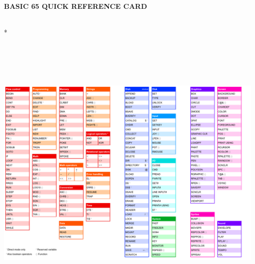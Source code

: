 %

\def\printmanual{true}
\def\printmanualbleed{true}

\hypersetup{colorlinks=false,linkcolor=black,urlcolor=black}
\newpage






\cleardoublepage
{}








\appendix
\begin{appendices}
  
  
  
  
  
  
  
\end{appendices}

\printindex

\cleardoublepage

\pagestyle{empty}
\newpage
{\raggedright\huge\bf\color{headingblue} BASIC 65 QUICK REFERENCE CARD}
\vspace{12pt}
\\*
\includegraphics[angle=90,origin=c,height=5.75in]{images/illustrations/basic65_quick_reference_card.pdf}


